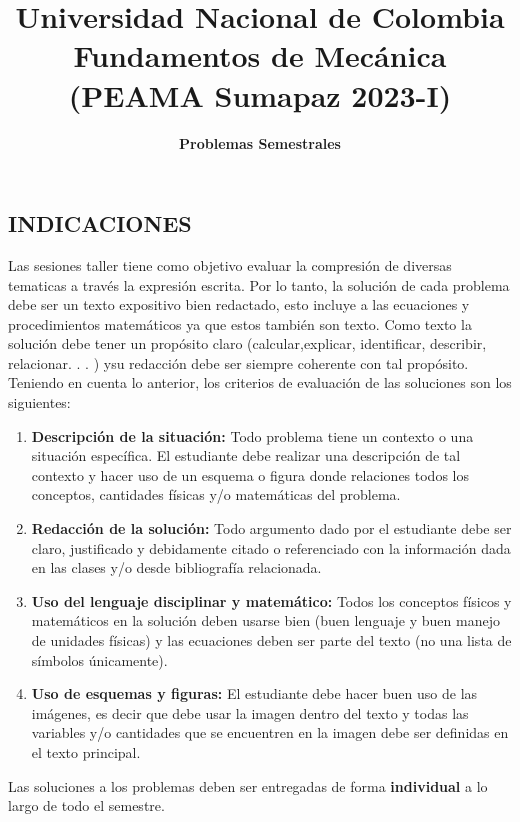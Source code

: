 \documentclass{article}
\title{Universidad Nacional de Colombia\\ Fundamentos de Mecánica\\ (PEAMA Sumapaz 2023-I)} %
\author{\textbf{Problemas Semestrales}} %
\begin{document}
\maketitle

\renewcommand{\tablename}{Tabla}

\subsection*{INDICACIONES}
Las sesiones taller tiene como objetivo evaluar la compresión de diversas tematicas a través la expresión escrita. Por lo tanto, la solución de cada problema debe ser un texto expositivo bien redactado, esto incluye a las ecuaciones y procedimientos matemáticos ya que estos también son texto. Como texto la solución debe tener un propósito claro (calcular,explicar, identificar, describir, relacionar. . . ) ysu redacción debe ser siempre coherente con tal propósito.\\

Teniendo en cuenta lo anterior, los criterios de evaluación de las soluciones son los siguientes:
\begin{enumerate}[label=\roman*)]
\item  \textbf{Descripción de la situación:} Todo problema tiene un contexto o una situación específica. El estudiante debe realizar una descripción de tal contexto y hacer uso de un esquema o figura donde relaciones todos los conceptos, cantidades físicas y/o matemáticas del problema.
\item \textbf{Redacción de la solución:} Todo argumento dado por el estudiante debe ser claro, justificado y debidamente citado o referenciado con la información dada en las clases y/o desde bibliografía relacionada.
\item \textbf{Uso del lenguaje disciplinar y matemático:} Todos los conceptos físicos y matemáticos en la solución deben usarse bien (buen lenguaje y buen manejo de unidades físicas) y las ecuaciones deben ser parte del texto (no una lista de símbolos únicamente).
\item \textbf{Uso de esquemas y figuras:} El estudiante debe hacer buen uso de las imágenes, es decir que debe usar la imagen dentro del texto y todas las variables y/o cantidades que se encuentren en la imagen debe ser definidas en el texto principal.
\end{enumerate}

Las soluciones a los problemas deben ser entregadas de forma \textbf{individual} a lo largo de todo el semestre. 
\end{document}
